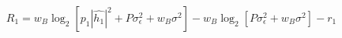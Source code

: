 \documentclass[preview]{standalone}
\begin{document}
\begin{align*}
R_1 = w_B \log_2 \left[p_1 \left|\hat{h_1}\right|^2 + P \sigma_{\epsilon}^2 + w_B \sigma^2\right] - w_B \log_2 \left[P \sigma_{\epsilon}^2 + w_B \sigma^2\right] - r_1
\end{align*}
\end{document}
